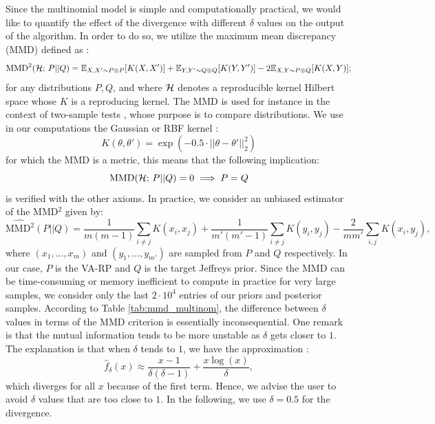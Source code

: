 Since the multinomial model is simple and computationally practical, we would like to quantify the effect of the divergence with different $\delta$ values on the output of the algorithm. In order to do so, we utilize the maximum mean discrepancy (MMD) defined as : 
\begin{equation}
    \text{MMD}^2(\mathcal{H};\,P||Q) = \mathbb{E}_{X,X'\sim P\otimes P}[K(X,X')] + \mathbb{E}_{Y,Y'\sim Q\otimes Q}[K(Y,Y')] - 2\mathbb{E}_{X,Y\sim P\otimes Q}[K(X,Y)];
\end{equation}
for any distributions $P,Q$, and where $\mathcal{H}$ denotes a reproducible kernel Hilbert space whose $K$ is a reproducing kernel. %
The MMD is used for instance in the context of two-sample tests \citep{gretton_kernel_2012}, whose purpose is to compare distributions. We use in our computations the Gaussian or RBF kernel : 
\begin{equation}
    K(\theta, \theta') = \exp(-0.5 \cdot ||\theta - \theta'||_2^2)
\end{equation} 
for which the MMD is a metric, this means that the following implication: 
\begin{equation}
    \text{MMD}(\mathcal{H};\,P||Q) = 0 \implies P=Q
\end{equation}
is verified with the other axioms. In practice, 
we consider an unbiased estimator of the MMD$^2$ given by: 
\begin{equation}
    \widehat{\text{MMD}^2}(P||Q) =  \frac{1}{m(m-1)} \sum_{i \neq j}K(x_i,x_j) +  \frac{1}{m'(m'-1)} \sum_{i \neq j}K(y_i,y_j) - \frac{2}{mm'} \sum_{i,j} K(x_i,y_j),
\end{equation}
where $(x_1,...,x_m)$ and $(y_1,...,y_{m'})$ are sampled from $P$ and $Q$ respectively. In our case, $P$ is the VA-RP and $Q$ is the target Jeffreys prior. Since the MMD can be time-consuming or memory inefficient to compute in practice for very large samples, we consider only the last $2 \cdot 10^4$ entries of our priors and posterior samples.
According to Table \ref{tab:mmd_multinom}, the difference between $\delta$ values in terms of the MMD criterion is essentially inconsequential. One remark is that the mutual information tends to be more unstable as $\delta$ gets closer to $1$. The explanation is that when $\delta$ tends to $1$, we have the approximation :
\[ \hat{f}_{\delta}(x) \approx \frac{x-1}{\delta(\delta-1)} + \frac{x\log(x)}{\delta},    \]
which diverges for all $x$ because of the first term. Hence, we advise the user to avoid $\delta$ values that are too close to $1$. In the following, we use $\delta = 0.5$ for the divergence.


